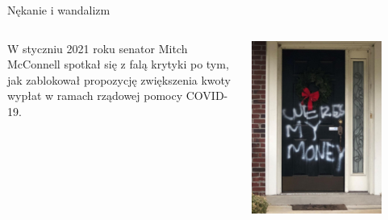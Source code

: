 \begin{frame}{Nękanie i wandalizm}
\begin{columns}[c]
    \begin{block}{}
      W styczniu 2021 roku senator Mitch McConnell spotkał się z falą krytyki po tym, jak zablokował propozycję zwiększenia kwoty wypłat w ramach rządowej pomocy COVID-19.
    \end{block}
    \includegraphics[width=0.8\textwidth]{images/vandalism.jpg}
\end{columns}
\end{frame}

